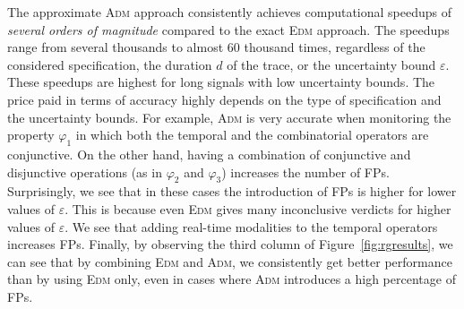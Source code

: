 The approximate \textsc{Adm} approach consistently achieves computational speedups of \emph{several orders of magnitude} 
compared to the exact \textsc{Edm} approach.
The speedups range from several thousands to almost 60 thousand times, regardless of the considered specification, the duration $d$ of the trace, or the uncertainty bound $\varepsilon$.
These speedups are highest for long signals with low uncertainty bounds.
The price paid in terms of accuracy highly depends on the type of specification and the uncertainty bounds.
For example, \textsc{Adm} is very accurate when monitoring the property $\varphi_1$ in which both the temporal and the combinatorial operators are conjunctive.
On the other hand, having a combination of conjunctive and disjunctive operations (as in $\varphi_{2}$ and $\varphi_{3}$) increases the number of FPs.
Surprisingly, we see that in these cases the introduction of FPs is higher for lower values of $\varepsilon$.
This is because even \textsc{Edm} gives many inconclusive verdicts for higher values of $\varepsilon$.
We see that adding real-time modalities to the temporal operators increases FPs.
Finally, by observing the third column of Figure~\ref{fig:rgresults}, we can see that by combining \textsc{Edm} and \textsc{Adm}, we consistently get better performance than by using \textsc{Edm} only, even in cases where \textsc{Adm} introduces a high percentage of FPs.



